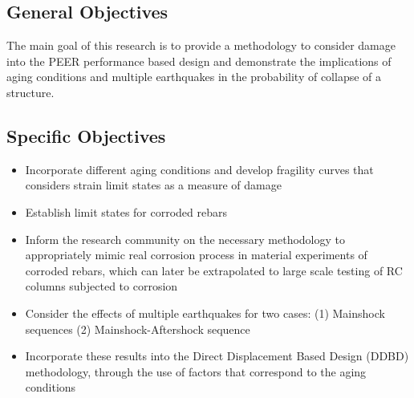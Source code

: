 \subsection{General Objectives}
The main goal of this research is to provide a methodology to consider damage into the PEER performance based design and demonstrate the implications of aging conditions and multiple earthquakes in the probability of collapse of a structure.

\subsection{Specific Objectives}
\begin{itemize}
	\item Incorporate different aging conditions and develop fragility curves that considers strain limit states as a measure of damage
	\item Establish limit states for corroded rebars
	\item Inform the research community on the necessary methodology to appropriately mimic real corrosion process in material experiments of corroded rebars, which can later be extrapolated to large scale testing of RC columns subjected to corrosion
	\item Consider the effects of multiple earthquakes for  two cases: (1) Mainshock sequences (2) Mainshock-Aftershock sequence
	\item Incorporate these results into the Direct Displacement Based Design (DDBD) methodology, through the use of factors that correspond to the aging conditions
\end{itemize}